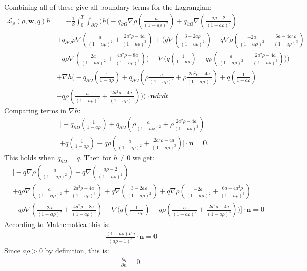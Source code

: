 \documentclass[11pt, a4paper]{article}
\theoremstyle{definition}
\newcommand{\w}{\mathbf{w}}
\newcommand{\n}{\mathbf{n}}
\begin{document}
Combining all of these give all boundary terms for the Lagrangian:
\begin{align*}
	\mathcal{L}_\rho (\rho,\w,q)h &= - \frac{1}{\beta}\int_0^T \int_{\partial \Omega} \bigg( h \bigg(-  q_{\partial \Omega}\nabla \rho \left( \frac{a}{(1 -a \rho)^2} \right)+ q_{\partial \Omega} \nabla \left(\frac{a \rho  - 2}{(1- a \rho)^2}\right) \\
	&+  q_{\partial \Omega}\rho \nabla \left( \frac{a}{(1- a \rho)^2} + \frac{2a^2\rho - 4a}{(1- a \rho)^3} \right)
	+ \bigg( q  \nabla \left( \frac{3-2a\rho}{(1-a\rho)^2} \right) + q \nabla \rho  \left( \frac{-2a }{(1-a\rho)^2} + \frac{6a-4a^2  \rho}{(1-a\rho)^3}  \right)\\
	&- q\rho \nabla \left(\frac{2a }{(1-a\rho)^2} + \frac{4a^2\rho -8a}{(1-a\rho)^3} \right) \bigg) -  \nabla \bigg(q \left(\frac{1}{1- a\rho} \right)  - q\rho  \left(\frac{a }{(1-a\rho)^2} + \frac{2a^2\rho -4a}{(1-a\rho)^3} \right)  \bigg)	\bigg)\\
	& +\nabla h \bigg(- q_{\partial \Omega} \left(\frac{1}{1 - a\rho}\right) + q_{\partial \Omega}\left( \rho \frac{a}{(1- a \rho)^2} + \rho\frac{2a^2\rho - 4a}{(1- a \rho)^3} \right) +q \left(\frac{1}{1- a\rho} \right) \\
	& - q\rho  \left(\frac{a }{(1-a\rho)^2} + \frac{2a^2\rho -4a}{(1-a\rho)^3} \right)  \bigg) \bigg) \cdot \n dr dt
\end{align*}
Comparing terms in $\nabla h$:
\begin{align*}
	&\bigg[-q_{\partial \Omega} \left(\frac{1}{1 - a\rho}\right) + q_{\partial \Omega}\left( \rho \frac{a}{(1- a \rho)^2} + \rho\frac{2a^2\rho - 4a}{(1- a \rho)^3} \right) \\
	&+q \left(\frac{1}{1- a\rho} \right)  - q\rho  \left(\frac{a }{(1-a\rho)^2} + \frac{2a^2\rho -4a}{(1-a\rho)^3} \right) \bigg] \cdot \n = 0.
\end{align*}
This holds when $q_{\partial \Omega} = q$.
Then for $h \neq 0$ we get:
\begin{align*}
	&\bigg[-q\nabla \rho \left( \frac{a}{(1 -a \rho)^2} \right)+q \nabla \left(\frac{a \rho  - 2}{(1- a \rho)^2}\right) \\
	&+q\rho \nabla \left( \frac{a}{(1- a \rho)^2} + \frac{2a^2\rho - 4a}{(1- a \rho)^3} \right)
	+  q  \nabla \left( \frac{3-2a\rho}{(1-a\rho)^2} \right) + q \nabla \rho  \left( \frac{-2a }{(1-a\rho)^2} + \frac{6a-4a^2  \rho}{(1-a\rho)^3}  \right)\\
	&- q\rho \nabla \left(\frac{2a }{(1-a\rho)^2} + \frac{4a^2\rho -8a}{(1-a\rho)^3} \right) -  \nabla \bigg(q \left(\frac{1}{1- a\rho} \right)  - q\rho  \left(\frac{a }{(1-a\rho)^2} + \frac{2a^2\rho -4a}{(1-a\rho)^3} \right) \bigg)\bigg] \cdot \n = 0
\end{align*}
According to Mathematica this is:
\begin{align*}
	\frac{(1 + a \rho) \nabla q}{(a \rho -1)^3}\cdot \n = 0
\end{align*}
Since $a \rho >0$ by definition, this is:
\begin{align*}
	\frac{\partial q}{\partial n} = 0.
\end{align*}
\end{document}
